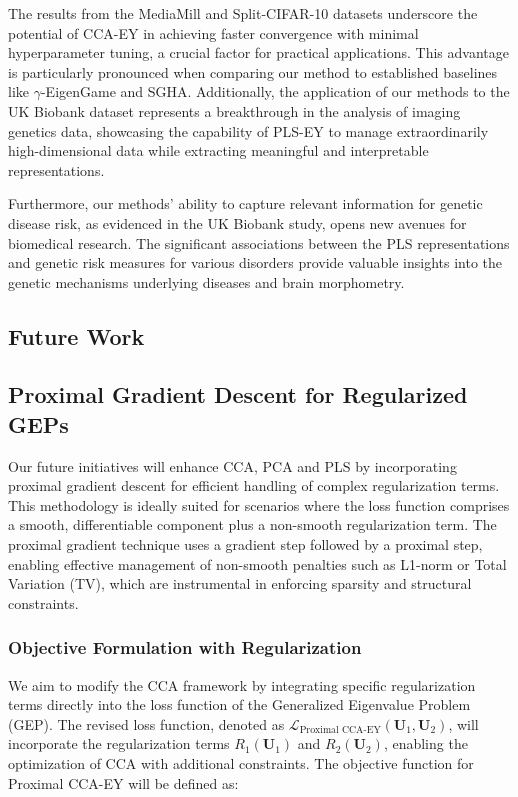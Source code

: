The results from the MediaMill and Split-CIFAR-10 datasets underscore the potential of CCA-EY in achieving faster convergence with minimal hyperparameter tuning, a crucial factor for practical applications.
This advantage is particularly pronounced when comparing our method to established baselines like $\gamma$-EigenGame and SGHA. Additionally, the application of our methods to the UK Biobank dataset represents a breakthrough in the analysis of imaging genetics data, showcasing the capability of PLS-EY to manage extraordinarily high-dimensional data while extracting meaningful and interpretable representations.

Furthermore, our methods' ability to capture relevant information for genetic disease risk, as evidenced in the UK Biobank study, opens new avenues for biomedical research.
The significant associations between the PLS representations and genetic risk measures for various disorders provide valuable insights into the genetic mechanisms underlying diseases and brain morphometry.

\subsection{Future Work}

\subsection{Proximal Gradient Descent for Regularized GEPs}

Our future initiatives will enhance CCA, PCA and PLS by incorporating proximal gradient descent for efficient handling of complex regularization terms. This methodology is ideally suited for scenarios where the loss function comprises a smooth, differentiable component plus a non-smooth regularization term. The proximal gradient technique uses a gradient step followed by a proximal step, enabling effective management of non-smooth penalties such as L1-norm or Total Variation (TV), which are instrumental in enforcing sparsity and structural constraints.

\subsubsection{Objective Formulation with Regularization}

We aim to modify the CCA framework by integrating specific regularization terms directly into the loss function of the Generalized Eigenvalue Problem (GEP). The revised loss function, denoted as $\mathcal{L}_{\text{Proximal CCA-EY}}(\mathbf{U}_1, \mathbf{U}_2)$, will incorporate the regularization terms $R_1(\mathbf{U}_1)$ and $R_2(\mathbf{U}_2)$, enabling the optimization of CCA with additional constraints. The objective function for Proximal CCA-EY will be defined as:

